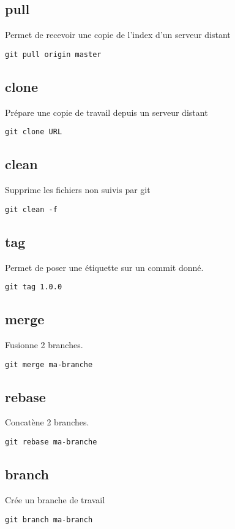 \documentclass[a4paper]{article}
\begin{document}
\subsection*{pull}
Permet de recevoir une copie de l'index d'un serveur distant
\begin{verbatim}
git pull origin master
\end{verbatim}

\subsection*{clone}
Prépare une copie de travail depuis un serveur distant
\begin{verbatim}
git clone URL
\end{verbatim}

\subsection*{clean}
Supprime les fichiers non suivis par git
\begin{verbatim}
git clean -f
\end{verbatim}

\subsection*{tag}
Permet de poser une étiquette sur un commit donné.
\begin{verbatim}
git tag 1.0.0
\end{verbatim}

\subsection*{merge}
Fusionne 2 branches.
\begin{verbatim}
git merge ma-branche
\end{verbatim}

\subsection*{rebase}
Concatène 2 branches.
\begin{verbatim}
git rebase ma-branche
\end{verbatim}

\subsection*{branch}
Crée un branche de travail
\begin{verbatim}
git branch ma-branch
\end{verbatim}
\end{document}
